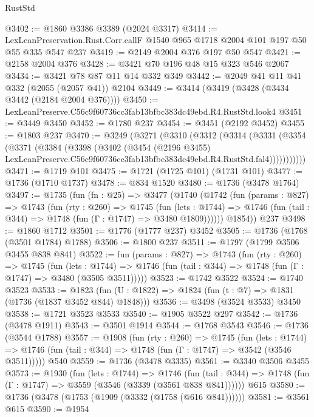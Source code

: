 \begin{lexlean}{RustStd}
\begin{coremodule}
@3402 := @1860 @3386 @3389 (@2024 @3317)
@3414 := LexLeanPreservation.Rust.Corr.callF @1540 @965 @1718 @2004 @101 @197 @50 @55 @335 @547 @237
@3419 := @2149 @2004 @376 @197 @50 @547
@3421 := @2158 @2004 @376
@3428 := @3421 @70 @196 @48 @15 @323 @546 @2067
@3434 := @3421 @78 @87 @11 @14 @332 @349
@3442 := @2049 @41 @11 @41 @332 (@2055 (@2057 @41)) @2104
@3449 := @3414 (@3419 (@3428 (@3434 @3442 (@2184 @2004 @376))))
@3450 := LexLeanPreserve.C56c9f60736cc3fab13bfbc383dc49ebd.R4.RustStd.look4
@3451 := @3449 @3450
@3452 := @1780 @237
@3454 := @3451 (@2192 @3452)
@3455 := @1803 @237
@3470 := @3249
    (@3271
      (@3310
        (@3312
          (@3314
            (@3331
              (@3354
                (@3371
                  (@3384
                    (@3398
                      (@3402
                        (@3454
                          (@2196 @3455)
                          LexLeanPreserve.C56c9f60736cc3fab13bfbc383dc49ebd.R4.RustStd.fal4)))))))))))
@3471 := @1719 @101
@3475 := @1721 (@1725 @101) (@1731 @101)
@3477 := @1736 (@1710 @1737)
@3478 := @834 @1520
@3480 := @1736 (@3478 @1764)
@3497 := @1735
    (fun (fn : @25) =>
    @3477
      (@1740
        (@1742
          (fun (params : @827) =>
          @1743
            (fun (rty : @260) =>
            @1745
              (fun (lets : @1744) =>
              @1746 (fun (tail : @344) => @1748 (fun (Γ : @1747) => @3480 @1809))))))
        @1854))
    @237
@3498 := @1860 @1712
@3501 := @1776 (@1777 @237) @3452
@3505 := @1736 (@1768 (@3501 @1784) @1788)
@3506 := @1800 @237
@3511 := @1797 (@1799 @3506 @3455 @838 @841)
@3522 := fun (params : @827) =>
  @1743
    (fun (rty : @260) =>
    @1745
      (fun (lets : @1744) =>
      @1746 (fun (tail : @344) => @1748 (fun (Γ : @1747) => @3480 (@3505 @3511)))))
@3523 := @1742 @3522
@3524 := @1740 @3523
@3533 := @1823 (fun (U : @1822) => @1824 (fun (t : @7) => @1831 (@1736 (@1837 @3452 @844) @1848)))
@3536 := @3498 (@3524 @3533) @3450
@3538 := @1721 @3523 @3533
@3540 := @1905 @3522 @297
@3542 := @1736 (@3478 @1911)
@3543 := @3501 @1914
@3544 := @1768 @3543
@3546 := @1736 (@3544 @1788)
@3557 := @1908
    (fun (rty : @260) =>
    @1745
      (fun (lets : @1744) =>
      @1746 (fun (tail : @344) => @1748 (fun (Γ : @1747) => @3542 (@3546 @3511)))))
    @540
@3559 := @1736 (@3478 @3335)
@3561 := @3340 @3506 @3455
@3573 := @1930
    (fun (lets : @1744) =>
    @1746 (fun (tail : @344) => @1748 (fun (Γ : @1747) => @3559 (@3546 (@3339 (@3561 @838 @841))))))
    @615
@3580 := @1736 (@3478 (@1753 (@1909 (@3332 (@1758 (@616 @841))))))
@3581 := @3561 @615
@3590 := @1954

\end{coremodule}
\end{lexlean}
